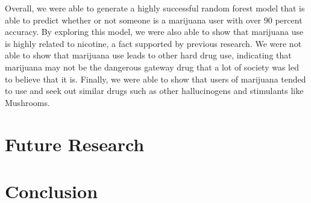\documentclass{article}
\begin{document}
Overall, we were able to generate a highly successful random forest model that is able to predict whether or not someone is a marijuana user with over 90 percent accuracy. By exploring this model, we were also able to show that marijuana use is highly related to nicotine, a fact supported by previous research. We were not able to show that marijuana use leads to other hard drug use, indicating that marijuana may not be the dangerous gateway drug that a lot of society was led to believe that it is. Finally, we were able to show that users of marijuana tended to use and seek out similar drugs such as other hallucinogens and stimulants like Mushrooms. 


\section{Future Research}

\section{Conclusion}
\end{document}
